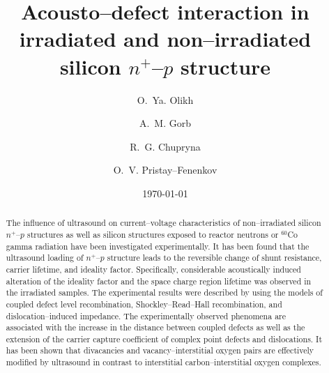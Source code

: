 \documentclass[aip,jap, amsmath,amssymb,reprint]{revtex4-1}
\begin{document}


\title{Acousto--defect interaction in irradiated and non--irradiated silicon $n^+$--$p$ structure}
\author{O.~Ya. Olikh}


\author{A.~M. Gorb}


\author{R.~G. Chupryna}

\author{O.~V. Pristay--Fenenkov}%





\date{\today}

\begin{abstract}
The influence of ultrasound on current--voltage characteristics of non--irradiated silicon $n^+$--$p$ structures as well as silicon structures exposed to reactor neutrons or $^{60}$Co gamma radiation have been investigated experimentally.
It has been found that the ultrasound loading of $n^+$--$p$ structure leads to the reversible change of shunt resistance, carrier lifetime, and  ideality factor.
Specifically, considerable acoustically induced alteration of the ideality factor and the space charge region lifetime was observed in the irradiated samples.
The experimental results were described by using the models of coupled defect level recombination, Shockley--Read--Hall recombination, and dislocation--induced impedance.
The experimentally observed phenomena are associated with the increase in the distance between coupled defects as well as the extension of the carrier capture coefficient of complex point defects and dislocations.
It has been shown that divacancies and vacancy--interstitial oxygen pairs are effectively modified by ultrasound in contrast to interstitial carbon--interstitial oxygen complexes.
\end{abstract}


\maketitle %
\end{document}

